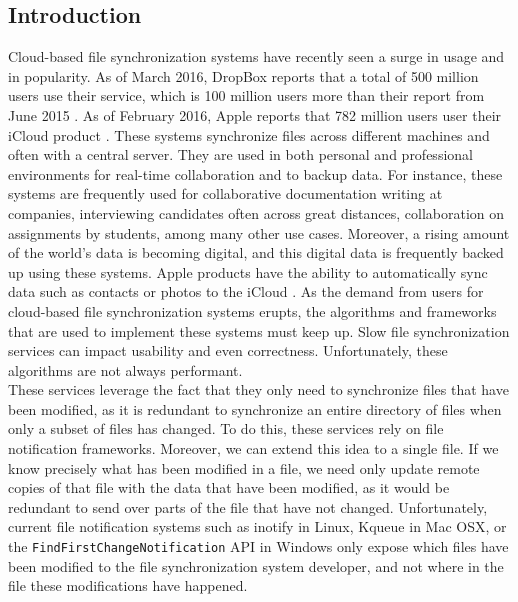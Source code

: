 \documentclass[table]{article}
\newcommand{\code}[1]{\texttt{#1}}
\begin{document}
\begin{multicols}{2}
\section{Introduction}

Cloud-based file synchronization systems have recently seen a surge in usage and in popularity. As of March 2016, DropBox reports that a total of 500 million users \cite{dropbox-500} use their service, which is 100 million users more than their report from June 2015 \cite{dropbox-400}. As of February 2016, Apple reports that 782 million users user their iCloud product \cite{apple-782}. These systems synchronize files across different machines and often with a central server. They are used in both personal and professional environments for real-time collaboration and to backup data. For instance, these systems are frequently used for collaborative documentation writing at companies, interviewing candidates often across great distances, collaboration on assignments by students, among many other use cases. Moreover, a rising amount of the world's data is becoming digital, and this digital data is frequently backed up using these systems. Apple products have the ability to automatically sync data such as contacts or photos to the iCloud \cite{icloud-sync}. As the demand from users for cloud-based file synchronization systems erupts, the algorithms and frameworks that are used to implement these systems must keep up. Slow file synchronization services can impact usability and even correctness. Unfortunately, these algorithms are not always performant.\\

These services leverage the fact that they only need to synchronize files that have been modified, as it is redundant to synchronize an entire directory of files when only a subset of files has changed. To do this, these services rely on file notification frameworks. Moreover, we can extend this idea to a single file. If we know precisely what has been modified in a file, we need only update remote copies of that file with the data that have been modified, as it would be redundant to send over parts of the file that have not changed. Unfortunately, current file notification systems such as inotify \cite{inotify} in Linux, Kqueue \cite{kqueue} in Mac OSX, or the \code{FindFirstChangeNotification} API \cite{windows} in Windows only expose which files have been modified to the file synchronization system developer, and not where in the file these modifications have happened.\\


\end{multicols}
\end{document}

